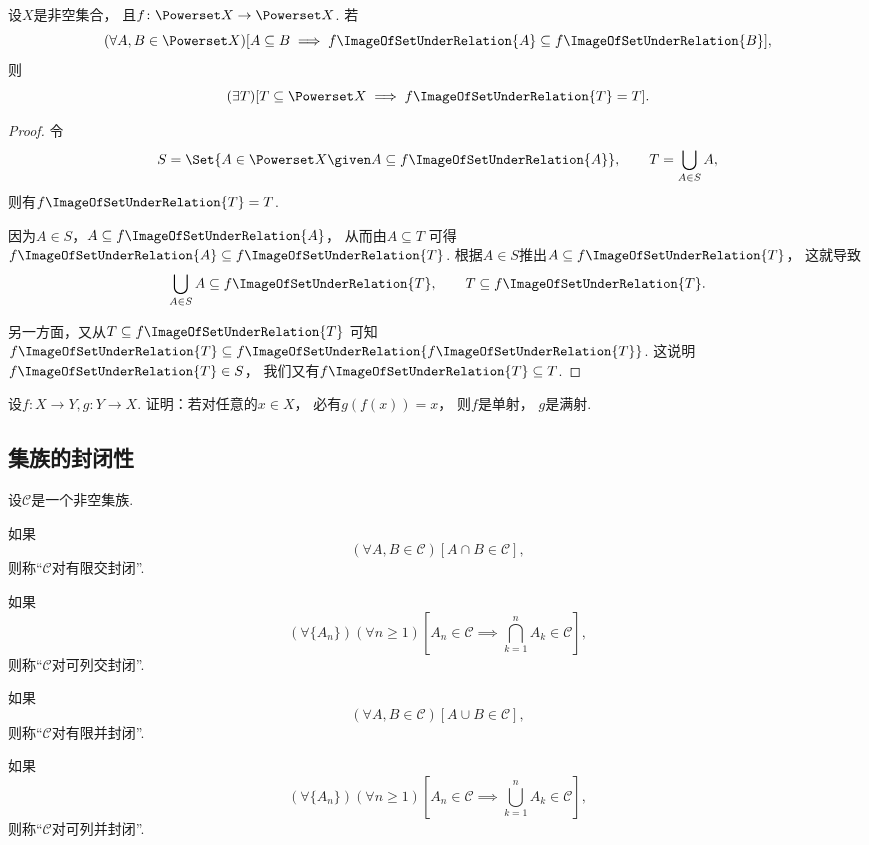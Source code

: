 \begin{example}
设\(X\)是非空集合，
且\(f\colon \Powerset X \to \Powerset X\).
若\begin{equation*}
	(\forall A,B \in \Powerset X)
	[
		A \subseteq B
		\implies
		f\ImageOfSetUnderRelation{A} \subseteq f\ImageOfSetUnderRelation{B}
	],
\end{equation*}
则\begin{equation*}
	(\exists T)
	[
		T \subseteq \Powerset X
		\implies
		f\ImageOfSetUnderRelation{T} = T
	].
\end{equation*}
\begin{proof}
令\[
	S = \Set{ A \in \Powerset X \given A \subseteq f\ImageOfSetUnderRelation{A} },
	\qquad
	T = \bigcup_{A \in S} A,
\]
则有\(f\ImageOfSetUnderRelation{T} = T\).

因为\(A \in S\)，\(A \subseteq f\ImageOfSetUnderRelation{A}\)，
从而由\(A \subseteq T\)
可得\(f\ImageOfSetUnderRelation{A} \subseteq f\ImageOfSetUnderRelation{T}\).
根据\(A \in S\)推出\(A \subseteq f\ImageOfSetUnderRelation{T}\)，
这就导致\[
	\bigcup_{A \in S} A \subseteq f\ImageOfSetUnderRelation{T},
	\qquad
	T \subseteq f\ImageOfSetUnderRelation{T}.
\]

另一方面，又从\(T \subseteq f\ImageOfSetUnderRelation{T}\)
可知\(f\ImageOfSetUnderRelation{T} \subseteq f\ImageOfSetUnderRelation{f\ImageOfSetUnderRelation{T}}\).
这说明\(f\ImageOfSetUnderRelation{T} \in S\)，
我们又有\(f\ImageOfSetUnderRelation{T} \subseteq T\).
\end{proof}
\end{example}
\begin{example}
设\(f\colon X \to Y,
g\colon Y \to X\).
证明：若对任意的\(x \in X\)，
必有\(g(f(x)) = x\)，
则\(f\)是单射，
\(g\)是满射.
\end{example}

\subsection{集族的封闭性}
\begin{definition}[集族的封闭性]
设\(\mathcal{C}\)是一个非空集族.

如果\[
	(\forall A,B\in\mathcal{C})
	[A \cap B \in \mathcal{C}],
\]
则称“\(\mathcal{C}\)对有限交封闭”.

如果\[
	(\forall \{A_n\})
	(\forall n\geq1)
	\left[A_n\in\mathcal{C} \implies \bigcap_{k=1}^n A_k \in \mathcal{C}\right],
\]
则称“\(\mathcal{C}\)对可列交封闭”.

如果\[
	(\forall A,B\in\mathcal{C})
	[A \cup B \in \mathcal{C}],
\]
则称“\(\mathcal{C}\)对有限并封闭”.

如果\[
	(\forall \{A_n\})
	(\forall n\geq1)
	\left[A_n\in\mathcal{C} \implies \bigcup_{k=1}^n A_k \in \mathcal{C}\right],
\]
则称“\(\mathcal{C}\)对可列并封闭”.
\end{definition}

